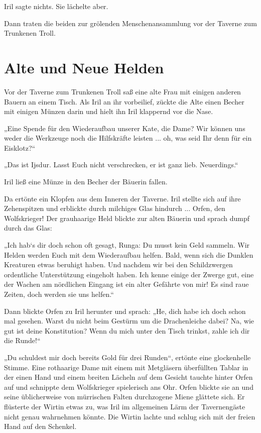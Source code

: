 Iril sagte nichts. Sie lächelte aber.

Dann traten die beiden zur grölenden Menschenansammlung vor der Taverne zum Trunkenen Troll.









\newpage
\section{Alte und Neue Helden}

Vor der Taverne zum Trunkenen Troll saß eine alte Frau mit einigen anderen Bauern an einem Tisch. Als Iril an ihr vorbeilief, zückte die Alte einen Becher mit einigen Münzen darin und hielt ihn Iril klappernd vor die Nase.

„Eine Spende für den Wiederaufbau unserer Kate, die Dame? Wir können uns weder die Werkzeuge noch die Hilfskräfte leisten ... oh, was seid Ihr denn für ein Eisklotz?“

„Das ist Ijsdur. Lasst Euch nicht verschrecken, er ist ganz lieb. Neuerdings.“

Iril ließ eine Münze in den Becher der Bäuerin fallen.

Da ertönte ein Klopfen aus dem Inneren der Taverne. Iril stellte sich auf ihre Zehenspitzen und erblickte durch milchiges Glas hindurch ... Orfen, den Wolfskrieger! Der grauhaarige Held blickte zur alten Bäuerin und sprach dumpf durch das Glas:

„Ich hab‘s dir doch schon oft gesagt, Runga: Du musst kein Geld sammeln. Wir Helden werden Euch mit dem Wiederaufbau helfen. Bald, wenn sich die Dunklen Kreaturen etwas beruhigt haben. Und nachdem wir bei den Schildzwergen ordentliche Unterstützung eingeholt haben. Ich kenne einige der Zwerge gut, eine der Wachen am nördlichen Eingang ist ein alter Gefährte von mir! Es sind raue Zeiten, doch werden sie uns helfen.“

Dann blickte Orfen zu Iril herunter und sprach: „He, dich habe ich doch schon mal gesehen. Warst du nicht beim Gestürm um die Drachenleiche dabei? Na, wie gut ist deine Konstitution? Wenn du mich unter den Tisch trinkst, zahle ich dir die Runde!“

„Du schuldest mir doch bereits Gold für drei Runden“, ertönte eine glockenhelle Stimme. Eine rothaarige Dame mit einem mit Metgläsern überfüllten Tablar in der einen Hand und einem breiten Lächeln auf dem Gesicht tauchte hinter Orfen auf und schnippte dem Wolfskrieger spielerisch ans Ohr. Orfen blickte sie an und seine üblicherweise von mürrischen Falten durchzogene Miene glättete sich. Er flüsterte der Wirtin etwas zu, was Iril im allgemeinen Lärm der Tavernengäste nicht genau wahrnehmen könnte. Die Wirtin lachte und schlug sich mit der freien Hand auf den Schenkel.


